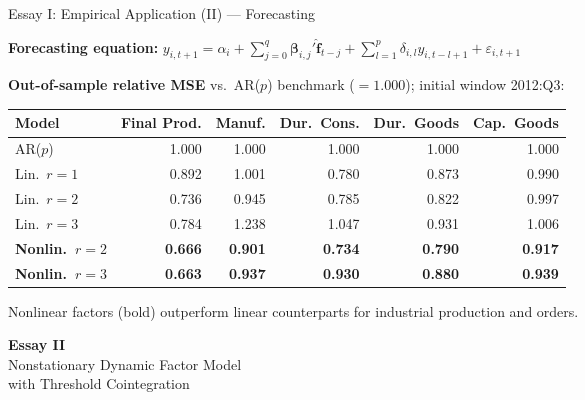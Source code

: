 \documentclass{beamer}
\begin{document}
\begin{frame}{Essay I: Empirical Application (II) --- Forecasting}

\textbf{Forecasting equation:} $y_{i,t+1}=\alpha_i + \sum_{j=0}^{q}\boldsymbol{\beta}_{i,j}'\hat{\boldsymbol{f}}_{t-j} + \sum_{l=1}^{p}\delta_{i,l}y_{i,t-l+1}+\varepsilon_{i,t+1}$

\vspace{0.3em}
\textbf{Out-of-sample relative MSE} vs.\ AR($p$) benchmark ($= 1.000$); initial window 2012:Q3:

\begin{adjustbox}{width=\textwidth,keepaspectratio}
\small
\begin{tabular}{lrrrrr}
\toprule
Model & Final Prod. & Manuf. & Dur.\ Cons. & Dur.\ Goods & Cap.\ Goods \\
\midrule
AR($p$)       & 1.000 & 1.000 & 1.000 & 1.000 & 1.000 \\
\midrule
Lin.\ $r=1$  & 0.892 & 1.001 & 0.780 & 0.873 & 0.990 \\
Lin.\ $r=2$  & 0.736 & 0.945 & 0.785 & 0.822 & 0.997 \\
Lin.\ $r=3$  & 0.784 & 1.238 & 1.047 & 0.931 & 1.006 \\
\midrule
\textbf{Nonlin.\ $r=2$} & \textbf{0.666} & \textbf{0.901} & \textbf{0.734} & \textbf{0.790} & \textbf{0.917} \\
\textbf{Nonlin.\ $r=3$} & \textbf{0.663} & \textbf{0.937} & \textbf{0.930} & \textbf{0.880} & \textbf{0.939} \\
\bottomrule
\end{tabular}
\end{adjustbox}

{\footnotesize Nonlinear factors (bold) outperform linear counterparts for industrial production and orders.}

\end{frame}

\begin{frame}{}
  \begin{center}
    \Large\textcolor{isegblue}{\textbf{Essay II}} \\[0.8em]
    \large Nonstationary Dynamic Factor Model\\
    with Threshold Cointegration
  \end{center}
\end{frame}
\end{document}
